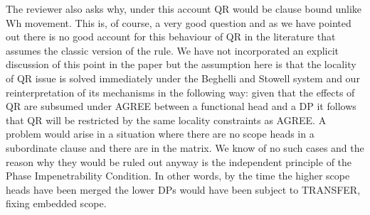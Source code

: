 \documentclass[11pt]{article}
\begin{document}
The reviewer also asks why, under this account QR would be clause bound unlike Wh movement. This is, of course, a very good question and as we have pointed out there is no good account for this behaviour of QR in the literature that assumes the classic version of the rule.   We have not incorporated an explicit discussion of this point in the paper but the assumption here is that the locality of QR issue is solved immediately under the Beghelli and Stowell system and our reinterpretation of its mechanisms in the following way: given that the effects of QR are subsumed under AGREE between a functional head and a DP it follows that QR will be restricted by the same locality constraints as AGREE.  A problem would arise in a situation where there are no scope heads in a subordinate clause and there are in the matrix.  We know of no such cases and the reason why they would be ruled out anyway is the independent principle of the Phase Impenetrability Condition.  In other words, by the time the higher scope heads have been merged the lower DPs would have been subject to TRANSFER, fixing embedded scope.
\end{document}

